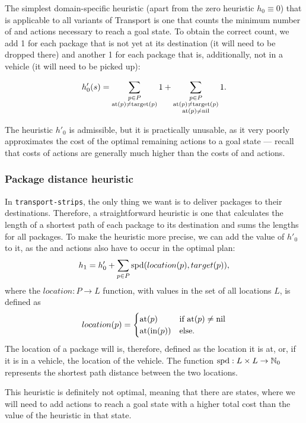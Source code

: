 The simplest domain-specific heuristic (apart from the zero heuristic $h_0 \equiv 0$) that is applicable to all variants of Transport
is one that counts the minimum number of \pickup{} and \drop{} actions
necessary to reach a goal state.
To obtain the correct count, we add 1 for each
package that is not yet at its destination (it will need to be dropped there) and another 1 for each package
that is, additionally, not in a vehicle (it will need to be picked up):

$$h'_{0}(s) = \sum_{\substack{
p \in P\\ \textrm{at}(p) \neq \textrm{target}(p)}} 1
+ \sum_{\substack{
p \in P\\ \textrm{at}(p) \neq \textrm{target}(p)\\
\textrm{at}(p) \neq \textrm{nil}}} 1.$$

The heuristic $h'_0$ is admissible, but it is practically unusable, as it
very poorly approximates 
the cost of the optimal remaining actions to a goal state
--- recall that costs of \drive{} actions are generally much higher than the costs of \pickup{} and \drop{} actions.

\subsubsection{Package distance heuristic}\label{sfa1}

In \texttt{transport-strips}, the only thing we want is to deliver packages to their destinations. Therefore, a straightforward heuristic is one that calculates the length of a shortest
path of each package to its destination and sums the lengths for all packages.
To make the heuristic more precise, we can add the
value of $h'_0$ to it, as the \pickup{} and \drop{}
actions also have to occur in the optimal plan:
$$h_1 = h'_0 + \sum_{p \in P} \textrm{spd}(location(p), target(p)),$$
where the $location: P \to L$ function,
with values in the set of all locations $L$, is defined as
$$location(p) = \begin{cases} 
   \textrm{at}(p) & \text{if } \textrm{at}(p) \neq \textrm{nil}\\
   \textrm{at}(\textrm{in}(p)) & \text{else}.
  \end{cases}$$
The location of a package will is, therefore, defined
as the location it is at, or, if it is in a vehicle,
the location of the vehicle.
The function $\textrm{spd}: L \times L \to \mathbb{N}_0$ represents
the shortest path distance between the two locations.

This heuristic is definitely not optimal, meaning that there are states,
where we will need to add actions to reach a goal state with a higher total cost than the value of the heuristic in that state.

